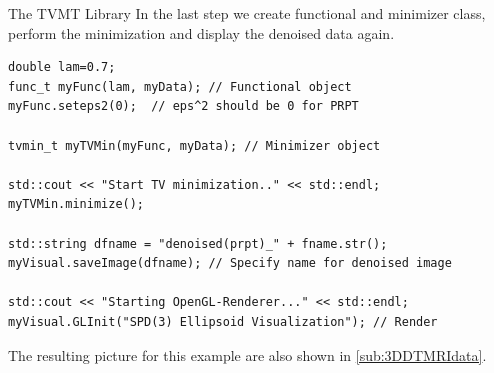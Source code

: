 \begin{chapter}{The TVMT Library}
In the last step we create functional and minimizer class, perform the minimization and display the denoised data again.

\cppinline
\begin{lstlisting}[label=code:tut3_rendernoisyimg,caption={Minimization and final rendering}]
double lam=0.7;
func_t myFunc(lam, myData); // Functional object
myFunc.seteps2(0);  // eps^2 should be 0 for PRPT

tvmin_t myTVMin(myFunc, myData); // Minimizer object

std::cout << "Start TV minimization.." << std::endl;
myTVMin.minimize();

std::string dfname = "denoised(prpt)_" + fname.str();
myVisual.saveImage(dfname); // Specify name for denoised image

std::cout << "Starting OpenGL-Renderer..." << std::endl;
myVisual.GLInit("SPD(3) Ellipsoid Visualization"); // Render
\end{lstlisting}

The resulting picture for this example are also shown in \ref{sub:3DDTMRIdata}.







\end{chapter}
